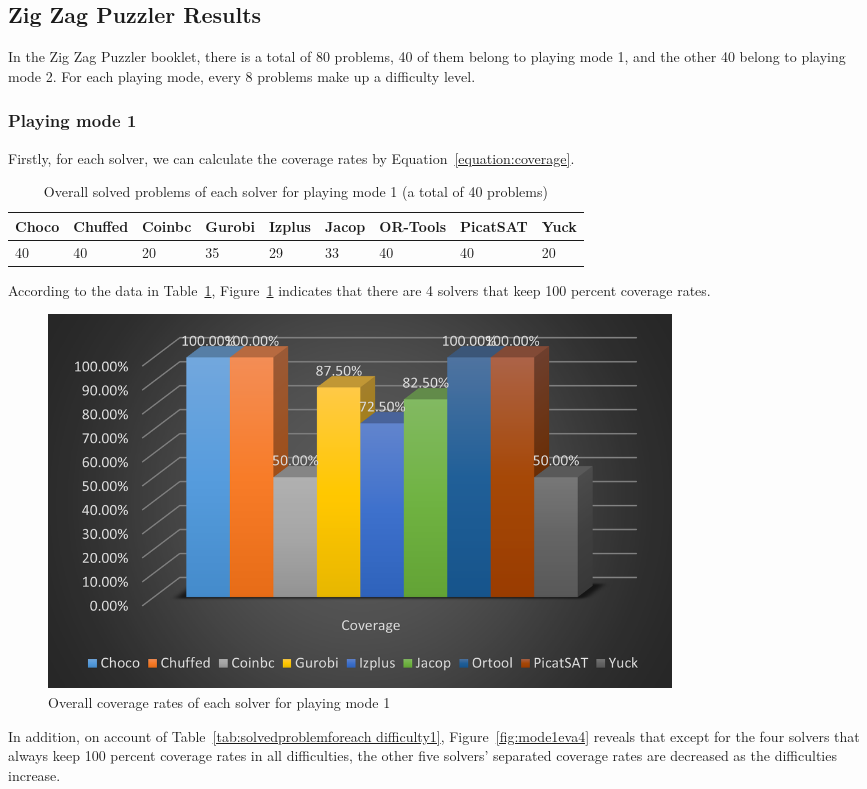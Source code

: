 \subsection{Zig Zag Puzzler Results}
\label{sec:Zig Zag Puzzlerresult}
In the Zig Zag Puzzler booklet, there is a total of 80 problems, 40 of them belong to playing mode 1, and the other 40 belong to playing mode 2. For each playing mode, every 8 problems make up a difficulty level. 
\subsubsection{Playing mode 1}
Firstly, for each solver, we can calculate the coverage rates by Equation~\ref{equation:coverage}.
\begin{table}[htbp]
\centering
\caption{Overall solved problems of each solver for playing mode 1 (a total of 40 problems)}
\label{tab:solvedproblem1}
\begin{tabular}{|l|l|l|l|l|l|l|l|l|}
\hline
Choco & Chuffed & Coinbc& Gurobi & Izplus&Jacop& OR-Tools& PicatSAT&Yuck \\
\hline
40   &40      & 20    & 35    &29     &33   &40    &40      &20\\
\hline
\end{tabular}
\end{table}
According to the data in Table~\ref{tab:solvedproblem1}, Figure~\ref{fig:mode1eva2} indicates that there are 4 solvers that keep 100 percent coverage rates.
\begin{figure}[H]
     \centering
    \includegraphics[width=0.8\textwidth]{figs/mode1coverage.png}
    \caption{Overall coverage rates of each solver for playing mode 1}
    \label{fig:mode1eva2}
\end{figure}
In addition, on account of Table~\ref{tab:solvedproblemforeach difficulty1}, Figure~\ref{fig:mode1eva4} reveals that except for the four solvers that always keep 100 percent coverage rates in all difficulties, the other five solvers' separated coverage rates are decreased as the difficulties increase.

